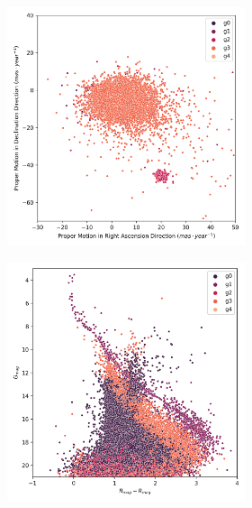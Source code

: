 \documentclass[11pt,a4paper,english,twocolumn]{article}
\begin{document}
\begin{figure}[htbp]
\begin{subfigure}{\columnwidth}
\begin{subfigure}[t]{0.3\textwidth}
    \end{subfigure}
    \hfill
    \begin{subfigure}[t]{0.3\textwidth}
      \centering
      \includegraphics[width=\textwidth]{../figures/melotte_22/dec_pm_filtered_melotte_22.png}
    \end{subfigure}
  \end{subfigure}
  \medskip
  \begin{subfigure}{\columnwidth}
    \centering
    \begin{subfigure}[t]{0.3\textwidth}
      \centering
      \includegraphics[width=\textwidth]{../figures/melotte_22/kmeans_hr_diagram_melotte_22.png}

\end{subfigure}
\end{subfigure}
\end{figure}
\end{document}
